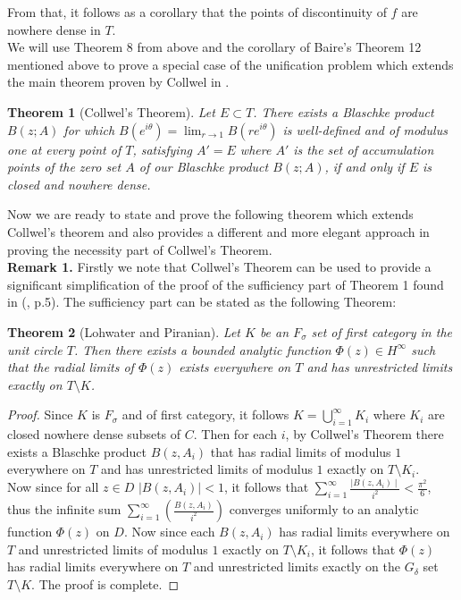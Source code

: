 \documentclass[12pt]{article}
\newtheorem{theorem}{Theorem}
\begin{document}
\noindent From that, it follows as a corollary that the points of discontinuity of $f$ are nowhere dense in $T$.
\\

\noindent We will use Theorem 8 from above and the corollary of Baire's Theorem 12 mentioned above to prove a special case of the unification problem which extends the main theorem proven by Collwel in \cite{PE}.

\begin{theorem}[Collwel's Theorem] Let $E\subset T$. There exists a Blaschke product $B(z;A)$ for which $B(e^{i\theta})=\lim_{r\rightarrow 1}B(re^{i\theta})$ is well-defined and of modulus one at every point of $T$, satisfying $A'=E$ where $A'$ is the set of accumulation points of the zero set $A$ of our Blaschke product $B(z;A)$, if and only if $E$ is closed and nowhere dense.
\end{theorem}

\noindent Now we are ready to state and prove the following theorem which extends Collwel's theorem and also provides a different and more elegant approach in proving the necessity part of Collwel's Theorem.
\\



\noindent\textbf{Remark 1.}
\noindent Firstly we note that Collwel's Theorem can be used to provide a significant simplification of the proof of the sufficiency part of Theorem 1 found in (\cite{PI}, p.5). The sufficiency part can be stated as the following Theorem:
\begin{theorem}[Lohwater and Piranian] Let $K$ be an $F_\sigma$ set of first category in the unit circle $T$. Then there exists a bounded analytic function $\Phi(z)\in H^\infty$ such that the radial limits of $\Phi(z)$ exists everywhere on $T$ and has unrestricted limits exactly on $T\setminus K$.
\end{theorem}
\begin{proof}
Since $K$ is $F_\sigma$ and of first category, it follows $K=\bigcup_{i=1}^\infty K_i$ where $K_i$ are closed nowhere dense subsets of $C$. Then for each $i$, by Collwel's Theorem there exists a Blaschke product $B(z,A_i)$ that has radial limits of modulus $1$ everywhere on $T$ and has unrestricted limits of modulus $1$ exactly on $T\setminus K_i$.\\
Now since for all $z\in D$ $\mid B(z,A_i)\mid<1$, it follows that $\sum_{i=1}^\infty \frac{\mid B(z,A_i)\mid}{i^2}<\frac{\pi^2}{6}$, thus the infinite sum $\sum_{i=1}^\infty(\frac{B(z,A_i)}{i^2})$ converges uniformly to an analytic function $\Phi(z)$ on $D$. Now since each $B(z,A_i)$ has radial limits everywhere on $T$ and unrestricted limits of modulus $1$ exactly on $T\setminus K_i$, it follows that $\Phi(z)$ has radial limits everywhere on $T$ and unrestricted limits exactly on the $G_\delta$ set $T\setminus K$. The proof is complete.
\end{proof}
\end{document}

